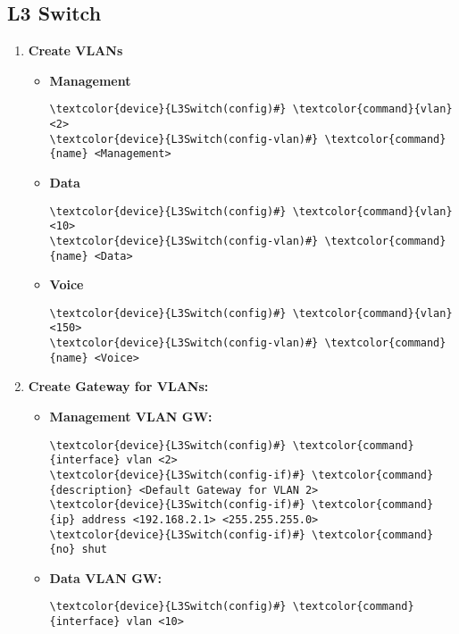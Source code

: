 \documentclass[10pt, a4paper, onecolumn, oneside, titlepage, openany]{book}
\begin{document}
\subsection{L3 Switch}
\begin{enumerate}
    \item \textbf{Create VLANs}
    \begin{itemize}
        \item \textbf{Management}
\begin{Verbatim}[commandchars=\\\{\}]
\textcolor{device}{L3Switch(config)#} \textcolor{command}{vlan} <2>
\textcolor{device}{L3Switch(config-vlan)#} \textcolor{command}{name} <Management>
\end{Verbatim}
        \item \textbf{Data}
\begin{Verbatim}[commandchars=\\\{\}]
\textcolor{device}{L3Switch(config)#} \textcolor{command}{vlan} <10>
\textcolor{device}{L3Switch(config-vlan)#} \textcolor{command}{name} <Data>
\end{Verbatim}
        \item \textbf{Voice}
\begin{Verbatim}[commandchars=\\\{\}]
\textcolor{device}{L3Switch(config)#} \textcolor{command}{vlan} <150>
\textcolor{device}{L3Switch(config-vlan)#} \textcolor{command}{name} <Voice>
\end{Verbatim}
    \end{itemize}
        \item \textbf{Create Gateway for VLANs:}
\begin{itemize}
    \item \textbf{Management VLAN GW:}
\begin{Verbatim}[commandchars=\\\{\}]
\textcolor{device}{L3Switch(config)#} \textcolor{command}{interface} vlan <2>
\textcolor{device}{L3Switch(config-if)#} \textcolor{command}{description} <Default Gateway for VLAN 2>
\textcolor{device}{L3Switch(config-if)#} \textcolor{command}{ip} address <192.168.2.1> <255.255.255.0>
\textcolor{device}{L3Switch(config-if)#} \textcolor{command}{no} shut
\end{Verbatim}
    \item \textbf{Data VLAN GW:}
\begin{Verbatim}[commandchars=\\\{\}]
\textcolor{device}{L3Switch(config)#} \textcolor{command}{interface} vlan <10>

\end{Verbatim}
\end{itemize}
\end{enumerate}
\end{document}
